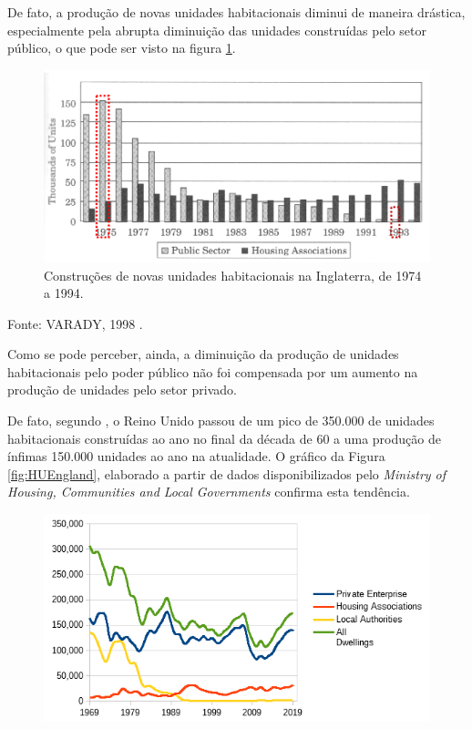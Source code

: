 \documentclass[
	12pt,				%
	oneside,			%
	a4paper,			%
	chapter=TITLE,		%
	section=TITLE,		%
	english,			%
	brazil				%
	]{abntex2}
\newcommand{\bcenter}{\begin{center}}
\newcommand{\ecenter}{\end{center}}
\begin{document}
\begin{refsection}
De fato, a produção de novas unidades habitacionais diminui de maneira drástica,
especialmente pela abrupta diminuição das unidades construídas pelo setor
público, o que pode ser visto na figura \ref{fig:inglaterra-unidades}.
\begin{figure}[H]

{\centering \includegraphics[width=0.7\linewidth]{images/inglaterra-unidades} 

}

\caption{Construções de novas unidades habitacionais na Inglaterra, de 1974 a 1994.}\label{fig:inglaterra-unidades}
\end{figure}
\bcenter

Fonte: VARADY, 1998 \autocite[\emph{apud}][73]{jung2018}.
\ecenter

Como se pode perceber, ainda, a diminuição da produção de unidades habitacionais
pelo poder público não foi compensada por um aumento na produção de unidades
pelo setor privado.

De fato, segundo , o Reino Unido passou
de um pico de 350.000 de unidades habitacionais construídas ao ano no final da
década de 60 a uma produção de ínfimas 150.000 unidades ao ano na atualidade. O
gráfico da Figura \ref{fig:HUEngland}, elaborado a partir de dados
disponibilizados pelo \emph{Ministry of Housing, Communities and Local Governments}
confirma esta tendência.
\begin{figure}[H]

{\centering \includegraphics[width=0.7\linewidth]{images/HUEngland} 

}
\end{figure}
\end{refsection}
\end{document}
